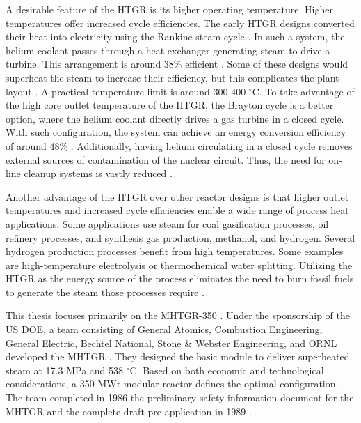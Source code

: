A desirable feature of the \gls{HTGR} is its higher operating temperature.
Higher temperatures offer increased cycle efficiencies.
The early \gls{HTGR} designs converted their heat into electricity using the Rankine steam cycle \cite{herranz_power_2009}.
In such a system, the helium coolant passes through a heat exchanger generating steam to drive a  turbine.
This arrangement is around 38\% efficient \cite{breeze_nuclear_2014}.
Some of these designs would superheat the steam to increase their efficiency, but this complicates the plant layout \cite{ballinger_balance_2004}.
A practical temperature limit is around 300-400 $^{\circ}$C.
To take advantage of the high core outlet temperature of the \gls{HTGR}, the Brayton cycle is a better option, where the helium coolant directly drives a gas turbine in a closed cycle.
With such configuration, the system can achieve an energy conversion efficiency of around 48\% \cite{breeze_nuclear_2014}.
Additionally, having helium circulating in a closed cycle removes external sources of contamination of the nuclear circuit.
Thus, the need for on-line cleanup systems is vastly reduced \cite{iaea_current_2001}.

Another advantage of the \gls{HTGR} over other reactor designs is that higher outlet temperatures and increased cycle efficiencies enable a wide range of process heat applications.
Some applications use steam for coal gasification processes, oil refinery processes, and synthesis gas production, methanol, and hydrogen.
Several hydrogen production processes benefit from high temperatures.
Some examples are high-temperature electrolysis or thermochemical water splitting.
Utilizing the \gls{HTGR} as the energy source of the process eliminates the need to burn fossil fuels to generate the steam those processes require \cite{iaea_current_2001}.

This thesis focuses primarily on the \gls{MHTGR}-350 \cite{neylan_modular_1988} \cite{silady_licensing_1988}.
Under the sponsorship of the \gls{US} \gls{DOE}, a team consisting of General Atomics, Combustion Engineering, General Electric, Bechtel National, Stone \& Webster Engineering, and \gls{ORNL} developed the \gls{MHTGR} \cite{neylan_modular_1988}.
They designed the basic module to deliver superheated steam at 17.3 MPa and 538 $^{\circ}$C.
Based on both economic and technological considerations, a 350 MWt modular reactor defines the optimal configuration.
The team completed in 1986 the preliminary safety information document for the \gls{MHTGR} and the complete draft pre-application in 1989 \cite{huning_steady_2014}.


